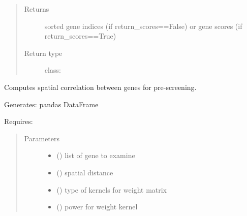 \documentclass[letterpaper,10pt,english]{sphinxmanual}
\begin{document}
\begin{fulllineitems}
\begin{fulllineitems}
\begin{quote}
\begin{description}
\item[{Returns}] \leavevmode
sorted gene indices (if return\_scores==False) or gene scores (if return\_scores==True)

\item[{Return type}] \leavevmode
class:

\end{description}\end{quote}

\end{fulllineitems}


\begin{fulllineitems}
\label{\detokenize{api:spaotsc.SpaOTsc.spatial_sc.spatial_correlation}}
Computes spatial correlation between genes for pre-screening.

Generates:  pandas DataFrame

Requires: 
\begin{quote}\begin{description}
\item[{Parameters}] \leavevmode\begin{itemize}
\item {} 
 () \textendash{} list of gene to examine

\item {} 
 () \textendash{} spatial distance

\item {} 
 (\sphinxstyleliteralemphasis{, }) \textendash{} type of kernels for weight matrix

\item {} 
 (\sphinxstyleliteralemphasis{, }) \textendash{} power for weight kernel

\end{itemize}

\end{description}\end{quote}


\end{fulllineitems}
\end{fulllineitems}
\end{document}

